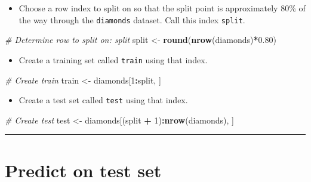 \documentclass[
]{book}
\newenvironment{Shaded}{\begin{snugshade}}{\end{snugshade}}
\newcommand{\CommentTok}[1]{\textcolor[rgb]{0.56,0.35,0.01}{\textit{#1}}}
\newcommand{\DecValTok}[1]{\textcolor[rgb]{0.00,0.00,0.81}{#1}}
\newcommand{\FloatTok}[1]{\textcolor[rgb]{0.00,0.00,0.81}{#1}}
\newcommand{\KeywordTok}[1]{\textcolor[rgb]{0.13,0.29,0.53}{\textbf{#1}}}
\newcommand{\NormalTok}[1]{#1}
\newcommand{\OperatorTok}[1]{\textcolor[rgb]{0.81,0.36,0.00}{\textbf{#1}}}
\newcommand{\StringTok}[1]{\textcolor[rgb]{0.31,0.60,0.02}{#1}}
\providecommand{\tightlist}{%
  \setlength{\itemsep}{0pt}\setlength{\parskip}{0pt}}
\begin{document}
\begin{itemize}
\tightlist
\item
  Choose a row index to split on so that the split point is approximately 80\% of the way through the \texttt{diamonds} dataset. Call this index \texttt{split}.
\end{itemize}

\begin{Shaded}
\begin{Highlighting}[]
\CommentTok{# Determine row to split on: split}
\NormalTok{split <-}\StringTok{ }\KeywordTok{round}\NormalTok{(}\KeywordTok{nrow}\NormalTok{(diamonds)}\OperatorTok{*}\FloatTok{0.80}\NormalTok{)}
\end{Highlighting}
\end{Shaded}

\begin{itemize}
\tightlist
\item
  Create a training set called \texttt{train} using that index.
\end{itemize}

\begin{Shaded}
\begin{Highlighting}[]
\CommentTok{# Create train}
\NormalTok{train <-}\StringTok{ }\NormalTok{diamonds[}\DecValTok{1}\OperatorTok{:}\NormalTok{split, ]}
\end{Highlighting}
\end{Shaded}

\begin{itemize}
\tightlist
\item
  Create a test set called \texttt{test} using that index.
\end{itemize}

\begin{Shaded}
\begin{Highlighting}[]
\CommentTok{# Create test}
\NormalTok{test <-}\StringTok{ }\NormalTok{diamonds[(split }\OperatorTok{+}\StringTok{ }\DecValTok{1}\NormalTok{)}\OperatorTok{:}\KeywordTok{nrow}\NormalTok{(diamonds), ]}
\end{Highlighting}
\end{Shaded}

\begin{center}\rule{0.5\linewidth}{0.5pt}\end{center}

\hypertarget{predict-on-test-set}{%
\section{Predict on test set}\label{predict-on-test-set}}
\end{document}
